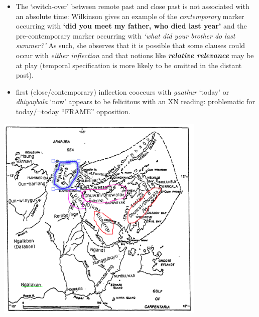 \documentclass[11pt]{article}
\begin{document}
\begin{itemize}

\item The `switch-over' between remote past and close past is not associated with an absolute time: Wilkinson gives an example of the \textit{contemporary} marker occurring with \textbf{`did you meet my father, who died last year'} and the pre-contemporary marker occurring with \textit{`what did your brother do last summer?'} As such, she observes that it is possible that some clauses could occur with \textit{either inflection} and that notions like \textit{\textbf{relative relevance}} may be at play (temporal specification is more likely to be omitted in the distant past).

\item first (close/contemporary) inflection cooccurs with \textit{gaathur} `today' or \textit{dhiyaŋbala} `now' appears to be felicitous with an XN reading: problematic for {\sc today/$\neg$today} ``FRAME'' opposition.
\end{itemize}

\includegraphics[width=0.75\textwidth]{yolngumatha.png}
\end{document}
